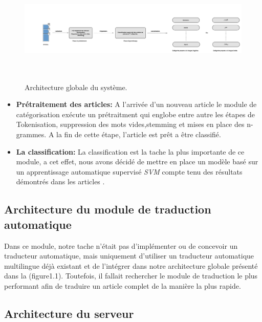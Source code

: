 \begin{figure}[H]
	\centering
	\includegraphics[height=150pt,width=500pt]{img/chapter3/categsche.jpg}
	\caption{Architecture globale du système.}
\end{figure}

\begin{itemize}
	
	\item \textbf{Prétraitement des articles:}
	A l'arrivée d'un nouveau article le module de catégorisation exécute un prétraitment qui englobe entre autre les étapes de Tokenisation, suppression des mots vides,stemming et mises en place des n-grammes.
    A la fin de cette étape, l'article est prêt a être classifié.\\
    
    \item \textbf{La classification:}
    La classification est la tache la plus importante de ce module, a cet effet, nous avons décidé de mettre en place un modèle basé sur un apprentissage automatique supervisé \emph{SVM} compte tenu des résultats démontrés dans les articles \cite{}\cite{}.\\ 

\end{itemize}



\subsection{Architecture du module de traduction automatique}
Dans ce module, notre tache n'était pas d'implémenter ou de concevoir un traducteur automatique, mais uniquement d'utiliser un traducteur automatique multilingue déjà existant et de l'intégrer dans notre architecture globale présenté dans la (figure1.1). Toutefois, il fallait rechercher le module de traduction le plus performant afin de traduire un article complet de la manière la plus rapide.

\subsection{Architecture du serveur}


